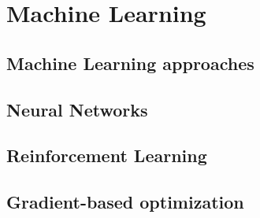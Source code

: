 \chapter{Machine Learning }
\label{sec:ml}

\section{Machine Learning approaches}

\section{Neural Networks}

\section{Reinforcement Learning}

\section{Gradient-based optimization}

